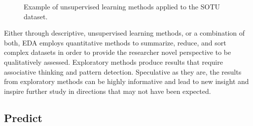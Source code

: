\documentclass[
  letterpaper,
  DIV=11,
  numbers=noendperiod]{scrreport}
\theoremstyle{definition}
\theoremstyle{remark}
\begin{document}
\begin{figure}

\begin{minipage}[t]{0.50\linewidth}

{\centering 


}

\end{minipage}%
%
\begin{minipage}[t]{0.50\linewidth}

{\centering 


}

\end{minipage}%

\caption{\label{fig-aa-eda-sotu-unsupervised}Example of unsupervised
learning methods applied to the SOTU dataset.}

\end{figure}

Either through descriptive, unsupervised learning methods, or a
combination of both, EDA employs quantitative methods to summarize,
reduce, and sort complex datasets in order to provide the researcher
novel perspective to be qualitatively assessed. Exploratory methods
produce results that require associative thinking and pattern detection.
Speculative as they are, the results from exploratory methods can be
highly informative and lead to new insight and inspire further study in
directions that may not have been expected.

\hypertarget{sec-aa-predict}{%
\subsection{Predict}\label{sec-aa-predict}}
\end{document}
